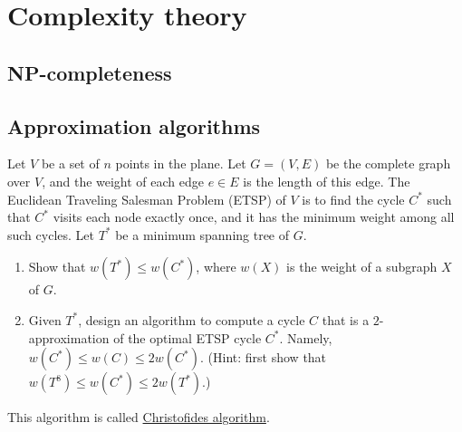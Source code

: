 \chapter{Complexity theory}

\section{NP-completeness}


\section{Approximation algorithms}
\begin{Exercise}[origin={NCU CSIE 100},title={Christofides algorithm}]
Let $V$ be a set of $n$ points in the plane. Let $G = (V, E)$ be the complete graph over $V$, and the weight of each edge $e \in E$ is the length of this edge. The Euclidean Traveling Salesman Problem (ETSP) of $V$ is to find the cycle $C^*$ such that $C^*$ visits each node exactly once, and it has the minimum weight among all such cycles. Let $T^*$ be a minimum spanning tree of $G$.
\begin{enumerate}
\item Show that $w(T^*) \leq w(C^*)$, where $w(X)$ is the weight of a subgraph $X$ of $G$.
\item Given $T^*$, design an algorithm to compute a cycle $C$ that is a $2$-approximation of the optimal ETSP cycle $C^*$. Namely, $w(C^*) \leq w(C) \leq 2w(C^*)$. (Hint: first show that $w(T^8) \leq w(C^*) \leq 2w(T^*)$.)
\end{enumerate}
\end{Exercise}
\begin{Answer}
This algorithm is called \href{https://en.wikipedia.org/wiki/Christofides_algorithm}{Christofides algorithm}.
\end{Answer}

\printbibliography[heading=subbibliography]
